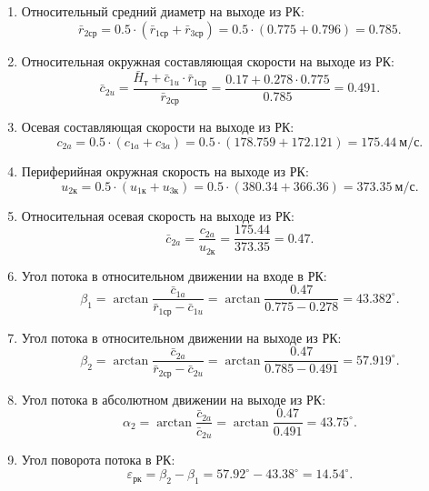 \documentclass[a4paper,12pt]{article}
\begin{document}
\begin{enumerate}
        \item Относительный средний диаметр на выходе из РК:
        \[
            \bar{r}_{2ср} = 0.5 \cdot ( \bar{r}_{1ср} + \bar{r}_{3ср} ) = 
            0.5 \cdot ( 0.775 + 0.796 ) = 
            0.785.
        \]

        \item Относительная окружная составляющая скорости на выходе из РК:
        \[
            \bar{c}_{2u} = \frac{ \bar{H}_т + \bar{c}_{1u} \cdot \bar{r}_{1ср} }{ \bar{r}_{2ср} } =
            \frac{ 
                0.17 + 0.278 \cdot 0.775
            }{ 
                0.785 
            } = 
            0.491. 
        \]

        \item Осевая составляющая скорости на выходе из РК:
        \[
            c_{2a} = 0.5 \cdot (c_{1a} + c_{3a} ) = 
            0.5 \cdot (178.759 + 172.121) = 
            175.44\ м/с.
        \]

        \item Периферийная окружная скорость на выходе из РК:
        \[
            u_{2к} = 0.5 \cdot (u_{1к} + u_{3к}) = 
            0.5 \cdot ( 380.34 + 366.36 ) = 
            373.35\ м/с.
        \]

        \item Относительная осевая скорость на выходе из РК:
        \[
            \bar{c}_{2a} = \frac{ c_{2a} }{ u_{2к} } = 
            \frac{ 175.44 }{ 373.35 } = 
            0.47.
        \]

        \item Угол потока в относительном движении на входе в РК:
        \[
            \beta_1 = \arctan{ \frac{ \bar{c}_{1a} }{ \bar{r}_{1ср} - \bar{c}_{1u} } } = 
            \arctan{ \frac{ 0.47 }{ 0.775 - 0.278 } } =
            43.382^\circ.
        \] 

        \item Угол потока в относительном движении на выходе из РК:
        \[
            \beta_2 = \arctan{ \frac{ \bar{c}_{2a} }{ \bar{r}_{2ср} - \bar{c}_{2u} } } = 
            \arctan{ \frac{ 0.47 }{ 0.785 - 0.491 } } =
            57.919^\circ.
        \] 

        \item Угол потока в абсолютном движении на выходе из РК:
        \[
            \alpha_2 = \arctan{ \frac{ \bar{c}_{2a} }{ \bar{c}_{2u} } } = 
            \arctan{ \frac{ 0.47 }{ 0.491 } } =
            43.75^\circ.
        \]

        \item Угол поворота потока в РК:
        \[
            \varepsilon_{рк} = \beta_2 - \beta_1 = 
            57.92^\circ - 43.38^\circ = 
            14.54^\circ.
        \]


\end{enumerate}
\end{document}
